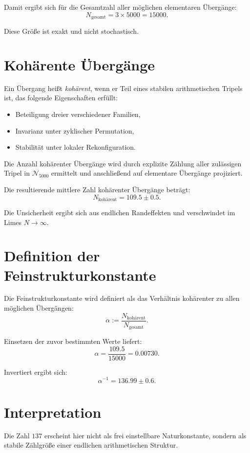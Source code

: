 \documentclass[11pt,a4paper]{article}
\begin{document}
Damit ergibt sich für die Gesamtzahl
aller möglichen elementaren Übergänge:
\[
N_{\text{gesamt}} = 3 \times 5000 = 15000.
\]

Diese Größe ist exakt und nicht stochastisch.

\section{Kohärente Übergänge}

Ein Übergang heißt \emph{kohärent}, wenn er Teil
eines stabilen arithmetischen Tripels ist,
das folgende Eigenschaften erfüllt:
\begin{itemize}
\item Beteiligung dreier verschiedener Familien,
\item Invarianz unter zyklischer Permutation,
\item Stabilität unter lokaler Rekonfiguration.
\end{itemize}

Die Anzahl kohärenter Übergänge
wird durch explizite Zählung
aller zulässigen Tripel in $\mathcal{N}_{5000}$
ermittelt und anschließend
auf elementare Übergänge projiziert.

Die resultierende mittlere Zahl kohärenter Übergänge beträgt:
\[
N_{\text{kohärent}} = 109.5 \pm 0.5.
\]

Die Unsicherheit ergibt sich aus endlichen Randeffekten
und verschwindet im Limes $N \to \infty$.

\section{Definition der Feinstrukturkonstante}

Die Feinstrukturkonstante wird definiert als
das Verhältnis kohärenter zu allen möglichen Übergängen:
\[
\alpha := \frac{N_{\text{kohärent}}}{N_{\text{gesamt}}}.
\]

Einsetzen der zuvor bestimmten Werte liefert:
\[
\alpha = \frac{109.5}{15000} = 0.00730.
\]

Invertiert ergibt sich:
\[
\alpha^{-1} = 136.99 \pm 0.6.
\]

\section{Interpretation}

Die Zahl $137$ erscheint hier nicht
als frei einstellbare Naturkonstante,
sondern als stabile Zählgröße
einer endlichen arithmetischen Struktur.
\end{document}
